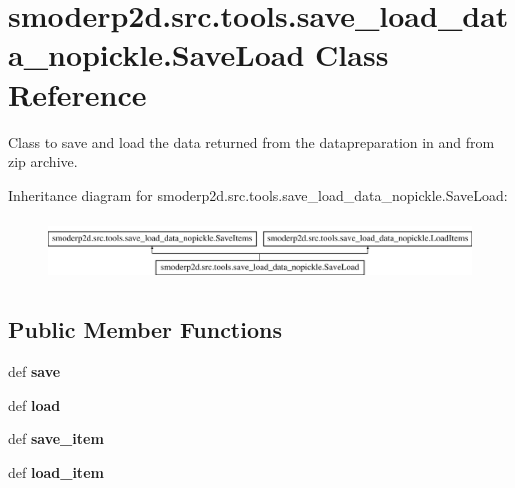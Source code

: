 \hypertarget{classsmoderp2d_1_1src_1_1tools_1_1save__load__data__nopickle_1_1SaveLoad}{\section{smoderp2d.\-src.\-tools.\-save\-\_\-load\-\_\-data\-\_\-nopickle.\-Save\-Load Class Reference}
\label{classsmoderp2d_1_1src_1_1tools_1_1save__load__data__nopickle_1_1SaveLoad}
}


Class to save and load the data returned from the datapreparation in and from zip archive.  


Inheritance diagram for smoderp2d.\-src.\-tools.\-save\-\_\-load\-\_\-data\-\_\-nopickle.\-Save\-Load\-:\begin{figure}[H]
\begin{center}
\leavevmode
\includegraphics[height=1.637427cm]{d8/d8a/classsmoderp2d_1_1src_1_1tools_1_1save__load__data__nopickle_1_1SaveLoad}
\end{center}
\end{figure}
\subsection*{Public Member Functions}
\begin{DoxyCompactItemize}
\item 
\hypertarget{classsmoderp2d_1_1src_1_1tools_1_1save__load__data__nopickle_1_1SaveLoad_a31316039ba0bb03ae075194fa64cfa41}{def {\bfseries save}}\label{classsmoderp2d_1_1src_1_1tools_1_1save__load__data__nopickle_1_1SaveLoad_a31316039ba0bb03ae075194fa64cfa41}

\item 
\hypertarget{classsmoderp2d_1_1src_1_1tools_1_1save__load__data__nopickle_1_1SaveLoad_a5c3b185f5ac9e5906b49d6cac5b7e02a}{def {\bfseries load}}\label{classsmoderp2d_1_1src_1_1tools_1_1save__load__data__nopickle_1_1SaveLoad_a5c3b185f5ac9e5906b49d6cac5b7e02a}

\item 
\hypertarget{classsmoderp2d_1_1src_1_1tools_1_1save__load__data__nopickle_1_1SaveLoad_a4998bf25b098e24c409bbc0f26722964}{def {\bfseries save\-\_\-item}}\label{classsmoderp2d_1_1src_1_1tools_1_1save__load__data__nopickle_1_1SaveLoad_a4998bf25b098e24c409bbc0f26722964}

\item 
\hypertarget{classsmoderp2d_1_1src_1_1tools_1_1save__load__data__nopickle_1_1SaveLoad_a85f4c4638f570a6b276f58026a004ac9}{def {\bfseries load\-\_\-item}}\label{classsmoderp2d_1_1src_1_1tools_1_1save__load__data__nopickle_1_1SaveLoad_a85f4c4638f570a6b276f58026a004ac9}

\end{DoxyCompactItemize}
